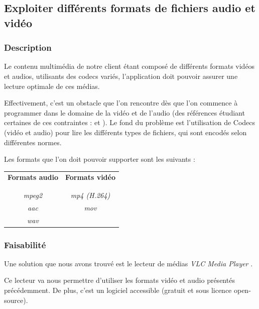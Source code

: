 \subsection{Exploiter différents formats de fichiers audio et vidéo}

\subsubsection{Description}

Le contenu multimédia de notre client étant composé de différents formats vidéos et audios, utilisants des codecs variés, l’application doit pouvoir assurer une lecture optimale de ces médias.

Effectivement, c’est un obstacle que l’on rencontre dès que l’on commence à programmer dans le domaine de la vidéo et de l’audio (des références étudiant certaines de ces contraintes : \cite{ghanbari1999video} et \cite{he2013introduction}).
Le fond du problème est l’utilisation de Codecs (vidéo et audio) pour lire les différents types de fichiers, qui sont encodés selon différentes normes.

Les formats que l’on doit pouvoir supporter sont les suivants :\\

\begin{center}
\begin{tabular}{c|c}
\textbf{Formats audio} & \textbf{Formats vidéo} \\
\\
\hline
\\
\textit{mpeg2} & \textit{mp4 (H.264)}\\
\textit{aac} & \textit{mov}\\
\textit{wav} & ~
\end{tabular}
\end{center}
\vspace{0.6cm}

\subsubsection{Faisabilité}

Une solution que nous avons trouvé est le lecteur de médias \textit{VLC Media Player} \cite{solutions2006vlc}.

Ce lecteur va nous permettre d'utiliser les formats vidéo et audio présentés précédemment. De plus, c'est un logiciel accessible (gratuit et sous licence open-source).

